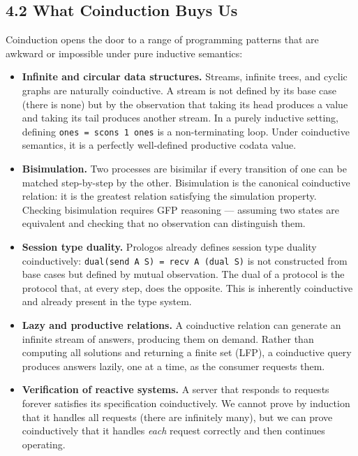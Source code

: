 \documentclass[11pt]{article}
\begin{document}
\subsection{4.2 What Coinduction Buys Us}
\label{sec:org23e3a4f}

Coinduction opens the door to a range of programming patterns that are
awkward or impossible under pure inductive semantics:

\begin{itemize}
\item \textbf{Infinite and circular data structures.} Streams, infinite trees,
and cyclic graphs are naturally coinductive. A stream is not defined
by its base case (there is none) but by the observation that taking
its head produces a value and taking its tail produces another
stream. In a purely inductive setting, defining \texttt{ones = scons 1
  ones} is a non-terminating loop. Under coinductive semantics, it is
a perfectly well-defined productive codata value.

\item \textbf{Bisimulation.} Two processes are bisimilar if every transition of
one can be matched step-by-step by the other. Bisimulation is the
canonical coinductive relation: it is the greatest relation
satisfying the simulation property. Checking bisimulation requires
GFP reasoning --- assuming two states are equivalent and checking
that no observation can distinguish them.

\item \textbf{Session type duality.} Prologos already defines session type
duality coinductively: \texttt{dual(send A S) = recv A (dual S)} is not
constructed from base cases but defined by mutual observation. The
dual of a protocol is the protocol that, at every step, does the
opposite. This is inherently coinductive and already present in the
type system.

\item \textbf{Lazy and productive relations.} A coinductive relation can generate
an infinite stream of answers, producing them on demand. Rather than
computing all solutions and returning a finite set (LFP), a
coinductive query produces answers lazily, one at a time, as the
consumer requests them.

\item \textbf{Verification of reactive systems.} A server that responds to
requests forever satisfies its specification coinductively. We
cannot prove by induction that it handles all requests (there are
infinitely many), but we can prove coinductively that it handles
\emph{each} request correctly and then continues operating.
\end{itemize}
\end{document}
